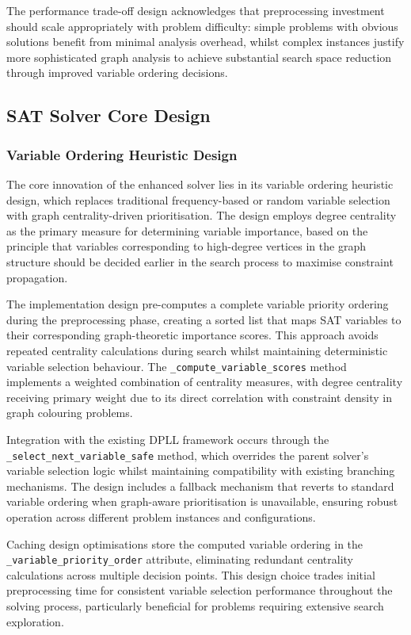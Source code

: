 The performance trade-off design acknowledges that preprocessing investment should scale appropriately with problem difficulty: simple problems with obvious solutions benefit from minimal analysis overhead, whilst complex instances justify more sophisticated graph analysis to achieve substantial search space reduction through improved variable ordering decisions.

\subsection{SAT Solver Core Design}

\subsubsection{Variable Ordering Heuristic Design}

The core innovation of the enhanced solver lies in its variable ordering heuristic design, which replaces traditional frequency-based or random variable selection with graph centrality-driven prioritisation. The design employs degree centrality as the primary measure for determining variable importance, based on the principle that variables corresponding to high-degree vertices in the graph structure should be decided earlier in the search process to maximise constraint propagation.

The implementation design pre-computes a complete variable priority ordering during the preprocessing phase, creating a sorted list that maps SAT variables to their corresponding graph-theoretic importance scores. This approach avoids repeated centrality calculations during search whilst maintaining deterministic variable selection behaviour. The \texttt{\_compute\_variable\_scores} method implements a weighted combination of centrality measures, with degree centrality receiving primary weight due to its direct correlation with constraint density in graph colouring problems.

Integration with the existing DPLL framework occurs through the \texttt{\_select\_next\_\-variable\_safe} method, which overrides the parent solver's variable selection logic whilst maintaining compatibility with existing branching mechanisms. The design includes a fallback mechanism that reverts to standard variable ordering when graph-aware prioritisation is unavailable, ensuring robust operation across different problem instances and configurations.

Caching design optimisations store the computed variable ordering in the \texttt{\_variable\_\-priority\_order} attribute, eliminating redundant centrality calculations across multiple decision points. This design choice trades initial preprocessing time for consistent variable selection performance throughout the solving process, particularly beneficial for problems requiring extensive search exploration.

